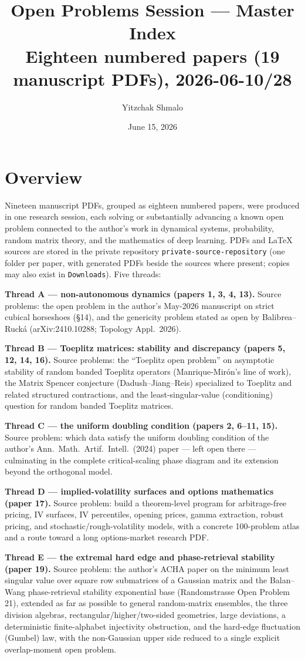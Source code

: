 \documentclass[11pt]{article}
\title{Open Problems Session --- Master Index\\
\large Eighteen numbered papers (19 manuscript PDFs), 2026-06-10/28}
\author{Yitzchak Shmalo}
\date{June 15, 2026}
\begin{document}
\maketitle

\section*{Overview}

Nineteen manuscript PDFs, grouped as eighteen numbered papers, were produced in
one research session, each solving or substantially advancing a known open
problem connected to the author's work in dynamical systems, probability, random
matrix theory, and the mathematics of deep learning.  PDFs and \LaTeX{} sources are stored in the private repository
\texttt{private-source-repository} (one folder per paper, with generated
PDFs beside the sources where present; copies may also exist in
\texttt{Downloads}).  Five threads:

\textbf{Thread A --- non-autonomous dynamics (papers 1, 3, 4, 13).}
Source problems: the open problem in the author's May-2026 manuscript on
strict cubical horseshoes (\S14), and the genericity problem stated as open by
Balibrea--Ruck\'a (arXiv:2410.10288; Topology Appl.\ 2026).

\textbf{Thread B --- Toeplitz matrices: stability and discrepancy (papers 5,
12, 14, 16).}  Source problems: the ``Toeplitz open problem'' on asymptotic
stability of random banded Toeplitz operators (Manrique-Mir\'on's line of work),
the Matrix Spencer conjecture (Dadush--Jiang--Reis) specialized to Toeplitz and
related structured contractions, and the least-singular-value (conditioning)
question for random banded Toeplitz matrices.

\textbf{Thread C --- the uniform doubling condition (papers 2, 6--11, 15).}
Source problem: which data satisfy the uniform doubling condition of the
author's Ann.\ Math.\ Artif.\ Intell.\ (2024) paper --- left open there ---
culminating in the complete critical-scaling phase diagram and its extension
beyond the orthogonal model.

\textbf{Thread D --- implied-volatility surfaces and options mathematics
(paper 17).}  Source problem: build a theorem-level program for arbitrage-free
pricing, IV surfaces, IV percentiles, opening prices, gamma extraction, robust
pricing, and stochastic/rough-volatility models, with a concrete 100-problem
atlas and a route toward a long options-market research PDF.

\textbf{Thread E --- the extremal hard edge and phase-retrieval stability
(paper 19).}  Source problem: the author's ACHA paper on the minimum least
singular value over square row submatrices of a Gaussian matrix and the
Balan--Wang phase-retrieval stability exponential base (Randomstrasse Open
Problem 21), extended as far as possible to general random-matrix ensembles, the
three division algebras, rectangular/higher/two-sided geometries, large
deviations, a deterministic finite-alphabet injectivity obstruction, and the
hard-edge fluctuation (Gumbel) law, with the non-Gaussian upper side reduced to a
single explicit overlap-moment open problem.
\end{document}
